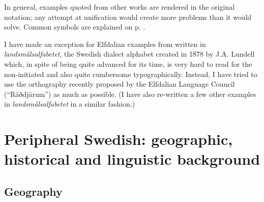 \begin{styleBodyTextFirst}
In general, examples quoted from other works are rendered in the original notation; any attempt at unification would create more problems than it would solve. Common symbols are explained on p. \pageref{bkm:Ref224104485}.

\end{styleBodyTextFirst}

\begin{styleBodytextC}
I have made an exception for Elfdalian examples from \citet{Levander1909} written in \textit{landsmålsalfabetet}, the Swedish dialect alphabet created in 1878 by J.A. Lundell which, in spite of being quite advanced for its time, is very hard to read for the non-initiated and also quite cumbersome typographically. Instead, I have tried to use the orthography recently proposed by the Elfdalian Language Council (“Råðdjärum”) as much as possible. (I have also re-written a few other examples in \textit{landsmålsalfabetet }in a similar fashion.)

\end{styleBodytextC}

\chapter[Peripheral Swedish: geographic, historical and linguistic background]{\rmfamily\bfseries Peripheral Swedish: geographic, historical and linguistic background}
\section{\rmfamily\bfseries Geography}

